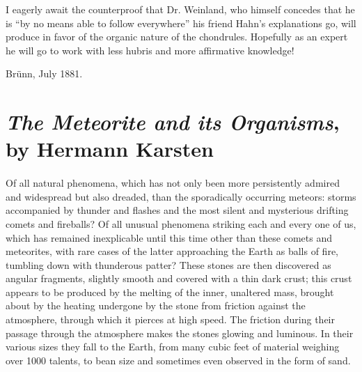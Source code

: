 \documentclass[a4paper, 12pt, oneside]{article}
\begin{document}
I eagerly await the counterproof that Dr. Weinland, who himself concedes that he is ``by no means able to follow everywhere'' his friend Hahn's explanations go, will produce in favor of the organic nature of the chondrules. Hopefully as an expert he will go to work with less hubris and more affirmative knowledge!

Brünn, July 1881.
\clearpage
\section{\emph{The Meteorite and its Organisms}, by Hermann Karsten}
\paragraph*{}
Of all natural phenomena, which has not only been more persistently admired and widespread but also dreaded, than the sporadically occurring meteors: storms accompanied by thunder and flashes and the most silent and mysterious drifting comets and fireballs? Of all unusual phenomena striking each and every one of us, which has remained inexplicable until this time other than these comets and meteorites, with rare cases of the latter approaching the Earth as balls of fire, tumbling down with thunderous patter? These stones are then discovered as angular fragments, slightly smooth and covered with a thin dark crust; this crust appears to be produced by the melting of the inner, unaltered mass, brought about by the heating undergone by the stone from friction against the atmosphere, through which it pierces at high speed. The friction during their passage through the atmosphere makes the stones glowing and luminous. In their various sizes they fall to the Earth, from many cubic feet of material weighing over 1000 talents, to bean size and sometimes even observed in the form of sand.
\end{document}
